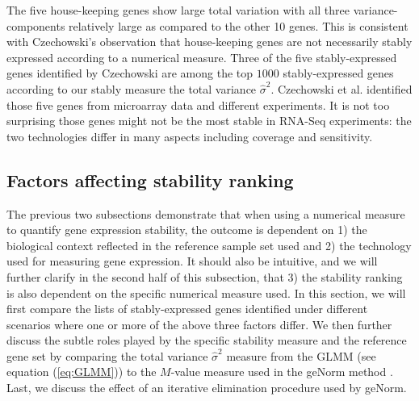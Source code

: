 \documentclass[letterpaper,12pt]{article}
\begin{document}
The five house-keeping genes show large total variation with all three
variance-components relatively large as compared to the other 10 genes. This is
consistent with Czechowski's observation that house-keeping genes are not necessarily stably
expressed according to a numerical measure. Three of the five
stably-expressed genes identified by Czechowski are among the top $1000$
stably-expressed genes according to our stably measure the total variance $\hat\sigma^2$. Czechowski et al.
identified those five genes from microarray data and different experiments. It
is not too surprising those genes might not be the most stable in RNA-Seq
experiments: the two technologies differ in many aspects including coverage
and sensitivity. 


\subsection{Factors affecting stability ranking}\label{section:stabilityMeasure}
The previous two subsections demonstrate that when using a numerical measure
to quantify gene expression stability, the outcome is dependent on 1) the
biological context reflected in the reference sample set used and 2) the
technology used for measuring gene expression. It should also be intuitive,
and we will further clarify in the second half of this subsection, that 3) the
stability ranking is also dependent on the specific numerical measure used.
In this section, we will first compare the lists of stably-expressed genes
identified under different scenarios where one or more of the above three
factors differ.  We then further discuss the subtle roles played by the
specific stability measure and the reference gene set by comparing the total
variance $\hat\sigma^2$ measure from the GLMM (see equation (\ref{eq:GLMM}))
to the $M$-value measure used in the geNorm method \citep{vandesompele2002accurate}.
Last, we discuss the effect of an iterative elimination procedure used by
geNorm.
\end{document}
